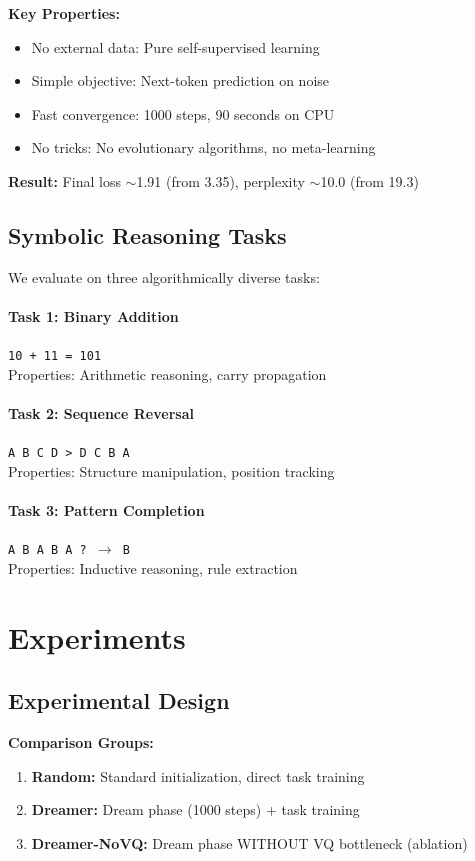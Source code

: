 \documentclass[11pt,twocolumn]{article}
\begin{document}
\textbf{Key Properties:}
\begin{itemize}
    \item No external data: Pure self-supervised learning
    \item Simple objective: Next-token prediction on noise
    \item Fast convergence: 1000 steps, 90 seconds on CPU
    \item No tricks: No evolutionary algorithms, no meta-learning
\end{itemize}

\textbf{Result:} Final loss $\sim$1.91 (from 3.35), perplexity $\sim$10.0 (from 19.3)

\subsection{Symbolic Reasoning Tasks}

We evaluate on three algorithmically diverse tasks:

\paragraph{Task 1: Binary Addition}
\texttt{10 + 11 = 101}
\\Properties: Arithmetic reasoning, carry propagation

\paragraph{Task 2: Sequence Reversal}
\texttt{A B C D > D C B A}
\\Properties: Structure manipulation, position tracking

\paragraph{Task 3: Pattern Completion}
\texttt{A B A B A ? $\rightarrow$ B}
\\Properties: Inductive reasoning, rule extraction

\section{Experiments}

\subsection{Experimental Design}

\textbf{Comparison Groups:}
\begin{enumerate}
    \item \textbf{Random:} Standard initialization, direct task training
    \item \textbf{Dreamer:} Dream phase (1000 steps) + task training
    \item \textbf{Dreamer-NoVQ:} Dream phase WITHOUT VQ bottleneck (ablation)
\end{enumerate}
\end{document}
